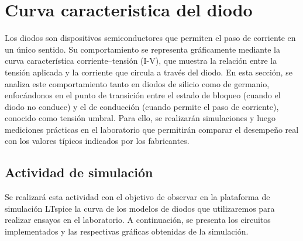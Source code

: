 \documentclass[chaptersright]{informeutn}
\begin{document}
\chapter{Curva caracteristica del diodo}
    Los diodos son dispositivos semiconductores que permiten el paso de corriente en un único sentido. Su comportamiento se representa 
    gráficamente mediante la curva característica corriente–tensión (I-V), que muestra la relación entre la tensión aplicada y la 
    corriente que circula a través del diodo. En esta sección, se analiza este comportamiento tanto en diodos de silicio como de 
    germanio, enfocándonos en el punto de transición entre el estado de bloqueo (cuando el diodo no conduce) y el de conducción (cuando 
    permite el paso de corriente), conocido como tensión umbral. Para ello, se realizarán simulaciones y luego mediciones prácticas en el 
    laboratorio que permitirán comparar el desempeño real con los valores típicos indicados por los fabricantes.
    
  \section{Actividad de simulación}
    Se realizará esta actividad con el objetivo de observar en la plataforma de simulación LTspice la curva de los modelos de diodos que 
    utilizaremos para realizar ensayos en el laboratorio. A continuación, se presenta los circuitos implementados y las respectivas 
    gráficas obtenidas de la simulación. 
\end{document}
